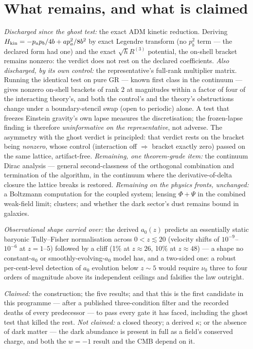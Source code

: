 \documentclass[aps,prd,twocolumn,10pt,nofootinbib,superscriptaddress]{revtex4-2}
\begin{document}
\section{What remains, and what is claimed}

\emph{Discharged since the ghost test:} the exact ADM kinetic reduction. Deriving
$H_{\rm kin}=-p_ap_b/4b+ap_a^2/8b^2$ by exact Legendre transform (no $p_b^2$ term --- the
declared form had one) and the exact $\sqrt hR^{(3)}$ potential, the on-shell bracket remains
nonzero: the verdict does not rest on the declared coefficients. \emph{Also discharged, by its own control:} the representative's full-rank multiplier
matrix. Running the identical test on pure GR --- known first class in the continuum --- gives
nonzero on-shell brackets of rank 2 at magnitudes within a factor of four of the interacting
theory's, and both the control's and the theory's obstructions change under a boundary-stencil
swap (open to periodic) alone. A test that freezes Einstein gravity's own lapse measures the
discretisation; the frozen-lapse finding is therefore \emph{uninformative on the
representative}, not adverse. The asymmetry with the ghost verdict is principled: that verdict
rests on the bracket being \emph{nonzero}, whose control (interaction off $\Rightarrow$ bracket
exactly zero) passed on the same lattice, artifact-free. \emph{Remaining, one theorem-grade
item:} the continuum Dirac analysis --- general second-classness of the orthogonal combination
and termination of the algorithm, in the continuum where the derivative-of-delta closure the
lattice breaks is restored. \emph{Remaining on the physics fronts, unchanged:} a Boltzmann
computation for the coupled system; lensing $\Phi+\Psi$ in the combined weak-field limit;
clusters; and whether the dark sector's dust remains bound in galaxies.

\emph{Observational shape carried over:} the derived $a_0(z)$ predicts an essentially static
baryonic Tully--Fisher normalisation across $0<z\lesssim20$ (velocity shifts of
$10^{-9}$--$10^{-6}$ at $z=1$--$5$) followed by a cliff (1\% at $z\approx26$, 10\% at
$z\approx48$) --- a shape no constant-$a_0$ or smoothly-evolving-$a_0$ model has, and a
two-sided one: a robust per-cent-level detection of $a_0$ evolution below $z\sim5$ would
require $\nu_0$ three to four orders of magnitude above its independent ceilings and falsifies
the law outright.

\emph{Claimed:} the construction; the five results; and that this is the first candidate in
this programme --- after a published three-condition filter and the recorded deaths of every
predecessor --- to pass every gate it has faced, including the ghost test that killed the rest.
\emph{Not claimed:} a closed theory; a derived $\kappa$; or the absence of dark matter --- the
dark abundance is present in full as a field's conserved charge, and both the $w=-1$ result and
the CMB depend on it.
\end{document}
